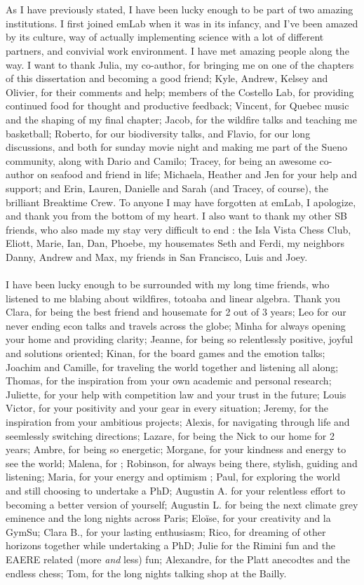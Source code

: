 \\\\
As I have previously stated, I have been lucky enough to be part of two amazing institutions. I first joined emLab when it was in its infancy, and I've been amazed by its culture, way of actually implementing science with a lot of different partners, and convivial work environment. I have met amazing people along the way. I want to thank Julia, my co-author, for bringing me on one of the chapters of this dissertation and becoming a good friend; Kyle, Andrew, Kelsey and Olivier, for their comments and help; members of the Costello Lab, for providing continued food for thought and productive feedback; Vincent, for Quebec music and the shaping of my final chapter; Jacob, for the wildfire talks and teaching me basketball; Roberto, for our biodiversity talks, and Flavio, for our long discussions, and both for sunday movie night and making me part of the Sueno community, along with Dario and Camilo; Tracey, for being an awesome co-author on seafood and friend in life; Michaela, Heather and Jen for your help and support; and Erin, Lauren, Danielle and Sarah (and Tracey, of course), the brilliant Breaktime Crew. To anyone I may have forgotten at emLab, I apologize, and thank you from the bottom of my heart. I also want to thank my other SB friends, who also made my stay very difficult to end : the Isla Vista Chess Club, Eliott, Marie, Ian, Dan, Phoebe, my housemates Seth and Ferdi, my neighbors Danny, Andrew and Max, my friends in San Francisco, Luis and Joey. 
\\\\
I have been lucky enough to be surrounded with my long time friends, who listened to me blabing about wildfires, totoaba and linear algebra. Thank you Clara, for being the best friend and housemate for 2 out of 3 years; Leo for our never ending econ talks and travels across the globe; Minha for always opening your home and providing clarity;  Jeanne, for being so relentlessly positive, joyful and solutions oriented; Kinan, for the board games and the emotion talks; Joachim and Camille, for traveling the world together and listening all along; Thomas, for the inspiration from your own academic and personal research; Juliette, for your help with competition law and your trust in the future; Louis Victor, for your positivity and your gear in every situation; Jeremy, for the inspiration from your ambitious projects; Alexis, for navigating through life and seemlessly switching directions; Lazare, for being the Nick to our home for 2 years; Ambre, for being so energetic;  Morgane, for your kindness and energy to see the world; Malena, for ; Robinson, for always being there, stylish, guiding and listening; Maria, for your energy and optimism ; Paul, for exploring the world and still choosing to undertake a PhD;  Augustin A. for your relentless effort to becoming a better version of yourself; Augustin L. for being the next climate grey eminence and the long nights across Paris; Eloïse, for your creativity and la GymSu; Clara B., for your lasting enthusiasm; Rico, for dreaming of other horizons together while undertaking a PhD; Julie for the Rimini fun and the EAERE related (more \textit{and} less) fun; Alexandre, for the Platt anecodtes and the endless chess; Tom, for the long nights talking shop at the Bailly.
